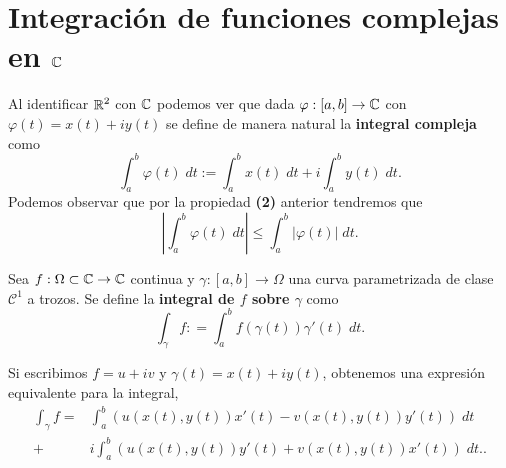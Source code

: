 \section{Integración de funciones complejas en $\displaystyle \mathbb{C} $}
Al identificar $\displaystyle \mathbb{R}^{2} $ con $\displaystyle \mathbb{C} $ podemos ver que dada $\displaystyle \varphi : \left[a,b\right] \to \mathbb{C} $ con $\displaystyle \varphi\left(t\right)=x\left(t\right) + iy\left(t\right) $ se define de manera natural la \textbf{integral compleja} como
	\[\int^{b}_{a} \varphi\left(t\right) \; dt := \int^{b}_{a} x\left(t\right) \; dt + i\int^{b}_{a} y\left(t\right) \; dt .\]
	Podemos observar que por la propiedad \textbf{(2)} anterior tendremos que 
\[ \left|\int^{b}_{a} \varphi\left(t\right) \; dt\right| \leq \int^{b}_{a} \left|\varphi\left(t\right)\right| \; dt .\]
\begin{definition}
	Sea $\displaystyle f : \Omega\subset \mathbb{C} \to \mathbb{C} $ continua y $\displaystyle \gamma : \left[a,b\right] \to \Omega  $ una curva parametrizada de clase $\displaystyle \mathcal{C}^{1} $ a trozos. Se define la \textbf{integral de $\displaystyle f $ sobre $\displaystyle \gamma  $} como
	\[\int _{\gamma }f : = \int^{b}_{a} f\left(\gamma\left(t\right)\right)\gamma'\left(t\right) \; dt .\]
\end{definition}
Si escribimos $\displaystyle f = u + iv $ y $\displaystyle \gamma\left(t\right)=x\left(t\right)+iy\left(t\right) $, obtenemos una expresión equivalente para la integral,
\[
\begin{split}
	\int _{\gamma }f = & \int^{b}_{a} \left(u\left(x\left(t\right), y\left(t\right)\right)x'\left(t\right)-v\left(x\left(t\right), y\left(t\right)\right)y'\left(t\right)\right) \; dt 
\\
			  + & i \int^{b}_{a} \left(u\left(x\left(t\right), y\left(t\right)\right)y'\left(t\right) + v\left(x\left(t\right), y\left(t\right)\right)x'\left(t\right)\right) \; dt..
\end{split}
\]

